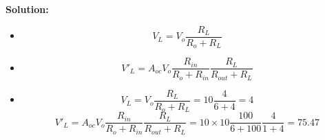 \begin{enumerate}
{\bf Solution:}
\begin{itemize}
\item \[ V_L=V_o \frac{R_L}{R_o+R_L} \]
\item \[ V'_L=A_{oc}V_o \frac{R_{in}}{R_o+R_{in}}\frac{R_L}{R_{out}+R_L} \]
\item \[ V_L=V_o \frac{R_L}{R_o+R_L}=10\frac{4}{6+4}=4  \]
  \[ V'_L=A_{oc}V_o \frac{R_{in}}{R_o+R_{in}}\frac{R_L}{R_{out}+R_L} 
  =10\times 10\frac{100}{6+100}\frac{4}{1+4}=75.47 \]
\end{itemize}

\end{enumerate}




